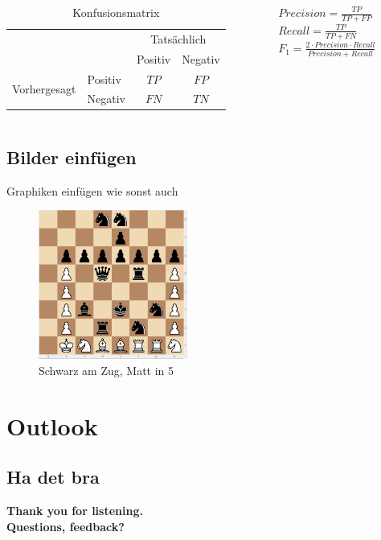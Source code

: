 \begin{frame}[noframenumbering]
 \begin{columns}
    \begin{column}{0.52\textwidth}
	\begin{table}
    	\begin{tabular}{l|l|c|c|}
    	\multicolumn{2}{c}{}&\multicolumn{2}{c}{Tatsächlich}\\
    	\cline{3-4}
    	\multicolumn{2}{c|}{}&Positiv&Negativ\\
    	\cline{2-4}
    	\multirow{2}{*}{Vorhergesagt}& Positiv & $TP$ & $FP$\\
    	\cline{2-4}
    	& Negativ & $FN$ & $TN$\\
    	\cline{2-4}
    	\end{tabular}
	    \caption{Konfusionsmatrix}
	    \label{tab:confusion-matrix}
    \end{table}
    \end{column}
    
    \begin{column}{0.52\textwidth}
    \begin{center}
        ${\displaystyle Precision = \frac{TP}{TP+FP} } $\\[5mm]
        ${\displaystyle Recall = \frac{TP}{TP+FN} } $\\[5mm]
        ${\displaystyle F_1 = \frac{2\cdot Precision\cdot Recall}{Precision + Recall} } $
    \end{center}
    \end{column}
 \end{columns}
\end{frame}

\subsection{Bilder einfügen}
\begin{frame}{Graphiken einfügen wie sonst auch}
    \begin{figure}
        \centering
        \includegraphics[height = 4.9cm]{puzzle.png}
        \caption{Schwarz am Zug, Matt in 5}
        \label{fig:chesspuzzle}
    \end{figure}
\end{frame}


\section{Outlook}
\subsection{Ha det bra}
\begin{frame}
\begin{center}\textbf{Thank you for listening.\\Questions, feedback?}\end{center}  
\end{frame}